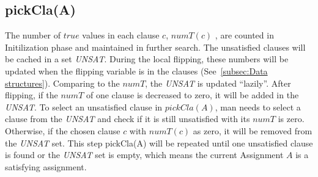\documentclass[12pt,a4paper,twoside]{scrartcl}
\numberwithin{equation}{section}
\begin{document}
\subsection{pickCla(A)}
The number of $true$ values in each clause $c$, $numT(c)$ , are counted in Initilization phase and maintained in further search. The unsatisfied clauses will be cached in a set \emph{UNSAT}. During the local flipping, these numbers will be updated when the flipping variable is in the clauses (See~\ref{subsec:Data structures}).  Comparing to the $numT$, the \emph{UNSAT} is updated  ``lazily''. After flipping, if the $numT$ of one clause is decreased to zero, it will be added in the \emph{UNSAT}.  To select an unsatisfied clause in $pickCla(A)$, man needs to select a clause from the \emph{UNSAT} and check if it is still unsatisfied with its $numT$ is zero. Otherwise, if the chosen clause $c$ with $numT(c)$ as zero, it will be removed from the \emph{UNSAT} set. This step pickCla(A) will be repeated until one unsatisfied clause is found or the \emph{UNSAT} set is empty, which means the current Assignment $A$ is a satisfying assignment.\\ 
\\
\end{document}
